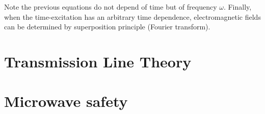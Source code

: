 Note the previous equations do not depend of time but of frequency $\omega$. Finally, when the time-excitation has an arbitrary time dependence, electromagnetic fields can be determined by superposition principle (Fourier transform). 

\section{Transmission Line Theory}

\section{Microwave safety}
\parencite[sec.5.8.3]{Benford2015}


